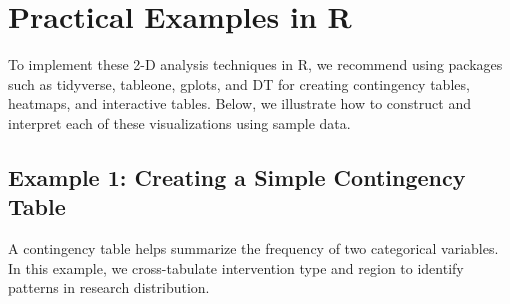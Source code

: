 \documentclass[
]{book}
\newenvironment{Shaded}{\begin{snugshade}}{\end{snugshade}}
\newcommand{\CommentTok}[1]{\textcolor[rgb]{0.56,0.35,0.01}{\textit{#1}}}
\newcommand{\FunctionTok}[1]{\textcolor[rgb]{0.13,0.29,0.53}{\textbf{#1}}}
\newcommand{\NormalTok}[1]{#1}
\newcommand{\OtherTok}[1]{\textcolor[rgb]{0.56,0.35,0.01}{#1}}
\newcommand{\SpecialCharTok}[1]{\textcolor[rgb]{0.81,0.36,0.00}{\textbf{#1}}}
\begin{document}
\section{Practical Examples in R}\label{practical-examples-in-r}

To implement these 2-D analysis techniques in R, we recommend using packages such as tidyverse, tableone, gplots, and DT for creating contingency tables, heatmaps, and interactive tables.
Below, we illustrate how to construct and interpret each of these visualizations using sample data.

\subsection{Example 1: Creating a Simple Contingency Table}\label{example-1-creating-a-simple-contingency-table}

A contingency table helps summarize the frequency of two categorical variables.
In this example, we cross-tabulate intervention type and region to identify patterns in research distribution.

\begin{Shaded}
\end{Shaded}
\end{document}
